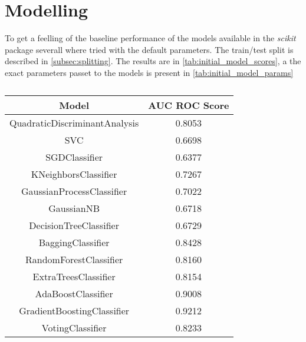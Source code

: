 \section{Modelling}
\label{sec:modelling}

To get a feelling of the baseline performance of the models available in
the \emph{scikit} package severall where tried with the default parameters.
The train/test split is described in \vref{subsec:splitting}.
The results are in \vref{tab:initial_model_scores}, a the
exact parameters passet to the models is present in
\vref{tab:initial_model_params}

\begin{table}[!h]
    \caption{}
    \label{tab:initial_model_scores}
    \centering
    \begin{tabular}{cc}
        Model & AUC ROC Score \\
        \hline
        QuadraticDiscriminantAnalysis & 0.8053 \\
        SVC & 0.6698 \\
        SGDClassifier & 0.6377 \\
        KNeighborsClassifier & 0.7267 \\
        GaussianProcessClassifier & 0.7022 \\
        GaussianNB & 0.6718 \\
        DecisionTreeClassifier & 0.6729 \\
        BaggingClassifier & 0.8428 \\
        RandomForestClassifier & 0.8160 \\
        ExtraTreesClassifier & 0.8154 \\
        AdaBoostClassifier & 0.9008 \\
        GradientBoostingClassifier & 0.9212 \\
        VotingClassifier & 0.8233 \\
    \end{tabular}
\end{table}
